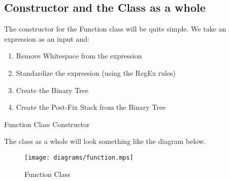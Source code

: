 \documentclass[../../../../../main.tex]{subfiles}
\begin{document}
\subsection{Constructor and the Class as a whole}
The constructor for the Function class will be quite simple. We take an expression as an input and:
\begin{enumerate}
	\item Remove Whitespace from the expression
	\item Standardize the expression (using the RegEx rules)
	\item Create the Binary Tree
	\item Create the Post-Fix Stack from the Binary Tree
\end{enumerate}
\begin{algorithm}
\DontPrintSemicolon
\caption{Function Class Constructor}
\end{algorithm}
The class as a whole will look something like the diagram below.
\begin{figure}[H]
	\centering
	\texttt{[image: diagrams/function.mps]}
	\caption{Function Class}
\end{figure}
\end{document}
